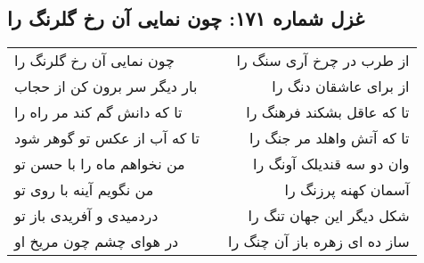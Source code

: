 \begin{center}
\section*{غزل شماره ۱۷۱: چون نمایی آن رخ گلرنگ را}
\label{sec:0171}
\begin{longtable}{l p{0.5cm} r}
چون نمایی آن رخ گلرنگ را
&&
از طرب در چرخ آری سنگ را
\\
بار دیگر سر برون کن از حجاب
&&
از برای عاشقان دنگ را
\\
تا که دانش گم کند مر راه را
&&
تا که عاقل بشکند فرهنگ را
\\
تا که آب از عکس تو گوهر شود
&&
تا که آتش واهلد مر جنگ را
\\
من نخواهم ماه را با حسن تو
&&
وان دو سه قندیلک آونگ را
\\
من نگویم آینه با روی تو
&&
آسمان کهنه پرزنگ را
\\
دردمیدی و آفریدی باز تو
&&
شکل دیگر این جهان تنگ را
\\
در هوای چشم چون مریخ او
&&
ساز ده ای زهره باز آن چنگ را
\\
\end{longtable}
\end{center}
